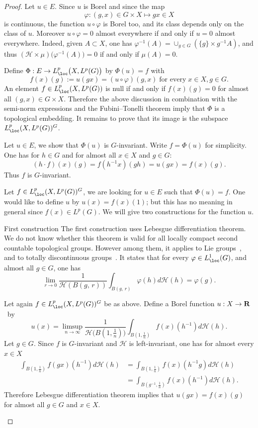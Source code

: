 \begin{proof}
Let $u \in E$. Since $u$ is Borel and since the map
\[
\varphi: (g,x) \in G \times X \mapsto gx \in X
\]
is continuous, the function $u \circ \varphi$ is Borel too, and its class depends only on the class of $u$. Moreover $u \circ \varphi = 0$ almost everywhere if and only if $u =0$ almost everywhere. Indeed, given $A \subset X$, one has $\varphi ^{-1} (A) = \cup _{g \in G} (\{g\} \times g^{-1}A)$, and thus $(\mathcal H \times \mu) \bigl(\varphi ^{-1} (A)\bigr) =0$ if and only if $\mu (A) =0$.

Define $\Phi: E \to L_{\loc} ^p \bigl(X, L^p(G)\bigr)$ by $\Phi (u) = f$ with
\[
f(x)(g):= u(gx) = (u \circ \varphi) (g,x)\;\text{for every}\;x \in X, g \in G.
\]
An element $f \in L_{\loc} ^p (X, L^p(G))$ is null if and only if $f(x)(g) =0$ for almost all $(g,x) \in G \times X$. Therefore the above discussion in combination with the semi-norm expressions and the Fubini--Tonelli theorem imply that $\Phi$ is a topological embedding. It remains to prove that its image is the subspace $L_{\loc} ^p (X, L^p(G))^G$.

Let $u \in E$, we show that $\Phi (u)$ is $G$-invariant. Write $f = \Phi (u)$ for simplicity. One has for $h \in G$ and for almost all $x \in X$ and $g \in G$:
\[
(h \cdot f)(x)(g)= f(h^{-1}x)(gh)= u(gx) = f(x)(g).
\]
Thus $f$ is $G$-invariant.

Let $f \in L_{\loc}^p (X, L^p(G))^G$, we are looking for $u \in E$ such that $\Phi (u) =f$. One would like to define $u$ by $u(x) = f(x)(1)$; but this has no meaning in general since $f(x) \in L^p(G)$. We will give two constructions for the function $u$.

\begin{step}{First construction}
The first construction uses Lebesgue differentiation theorem. We do not know whether this theorem is valid for all locally compact second countable topological groups. However among them, it applies to Lie groups~\cite[Theorem~1.8]{Hei}, and to totally discontinuous groups~\cite[Theorems~2.8.19 and 2.9.8]{Fed}. It states that for every $\varphi
\in L_{\loc}^1 (G)$, and almost all $g \in G$, one has
\[
\lim _{r \to 0} \frac{1}{\mathcal H \left(B(g,\,r)\right)} \int_{B(g,\,r)} \varphi(h) d\mathcal H(h) = \varphi (g).
\]

Let again $f \in L_{\loc}^p (X, L^p(G))^G$ be as above. Define a Borel function $u: X \to {\bf R}$~by
\[
u(x) = \limsup _{n \to \infty} \frac{1}{\mathcal H \bigl(B\left(1, \frac{1}{n}\right)\bigr) } \int _{B\left(1, \frac{1}{n}\right)} f(x)(h^{-1}) d\mathcal H(h).
\]
Let $g \in G$. Since $f$ is $G$-invariant and $\mathcal H$ is left-invariant, one has for almost every $x \in X$
\begin{align*}
\int _{B\left(1, \frac{1}{n}\right)} f(gx)(h^{-1}) d\mathcal H(h) &= \int _{B\left(1, \frac{1}{n}\right)} f(x)(h^{-1}g) d\mathcal H(h) \\
&= \int _{B\left(g^{-1}, \frac{1}{n}\right)} f(x)(h^{-1}) d\mathcal H(h).
\end{align*}
Therefore Lebesgue differentiation theorem implies that $u(gx) = f(x)(g)$ for almost all $g \in G$ and $x \in X$.
\end{step}


\end{proof}
